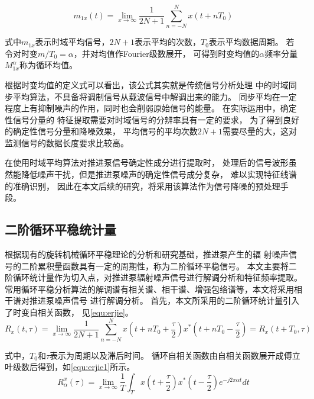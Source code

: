 \begin{equation}
    \label{equ:yijie}
    m_{1x} \left ( t \right ) =\lim_{x \to \infty} \frac{1}{2N+1}\sum_{n=-N}^{N}x\left ( t+nT_{0}  \right )   
\end{equation}

式中$m_{1x}$表示时域平均信号，$2N+1$表示平均的次数，$T_{0}$表示平均数据周期。
若令对时变$m/T_{0} =\alpha$，并对均值作Fourier级数展开，
可得到时变均值的$\alpha$频率分量$M_{1x}^{\alpha}$称为循环均值。

根据时变均值的定义式可以看出，该公式其实就是传统信号分析处理
中的时域同步平均算法，不具备将调制信号从载波信号中解调出来的能力。
同步平均在一定程度上有抑制噪声的作用，同时也会削弱原始信号的能量。
在实际运用中，确定性信号分量的
特征提取需要对时域信号的分辨率具有一定的要求，
为了得到良好的确定性信号分量和降噪效果，
平均信号的平均次数$2N+1$需要尽量的大，这对监测信号的数据长度要求比较高。

在使用时域平均算法对推进泵信号确定性成分进行提取时，
处理后的信号波形虽然能降低噪声干扰，但是推进泵噪声的确定性信号成分复杂，
难以实现特征线谱的准确识别，
因此在本文后续的研究，将采用该算法作为信号降噪的预处理手段。

\subsection{二阶循环平稳统计量}
根据现有的旋转机械循环平稳理论的分析和研究基础，推进泵产生的辐
射噪声信号的二阶累积量函数具有一定的周期性，称为二阶循环平稳信号。
本文主要将二阶循环统计量作为切入点，对推进泵辐射噪声信号进行解调分析和特征频率提取。
常用循环平稳分析算法的解调谱有相关谱、相干谱、增强包络谱等，本文将采用相干谱对推进泵噪声信号
进行解调分析。
首先，本文所采用的二阶循环统计量引入了时变自相关函数，
见\autoref{equ:erjie}。 
\begin{equation}
    \label{equ:erjie}
    R_{x} \left ( t,\tau  \right ) =\lim_{x \to \infty} \frac{1}{2N+1} \sum_{n=-N}^{N} x\left ( t+nT_0+\frac{\tau }{2}  \right )x^{\ast }\left ( t+nT_0-\frac{\tau }{2}  \right )=R_{x}\left ( t+T_0,\tau  \right )    
\end{equation}

式中，$T_0$和$\tau$表示为周期以及滞后时间。
循环自相关函数由自相关函数展开成傅立叶级数后得到，如\autoref{equ:erjie1}所示。
\begin{equation}
    \label{equ:erjie1}
    R_{\alpha }^{x} \left ( \tau  \right ) =\lim_{x \to \infty} \frac{1}{T}\int_{T}^{}x\left ( t+\frac{\tau }{2}  \right )x^{\ast } \left ( t-\frac{\tau }{2} \right ) e^{-j2\pi \alpha t} dt   
\end{equation}

